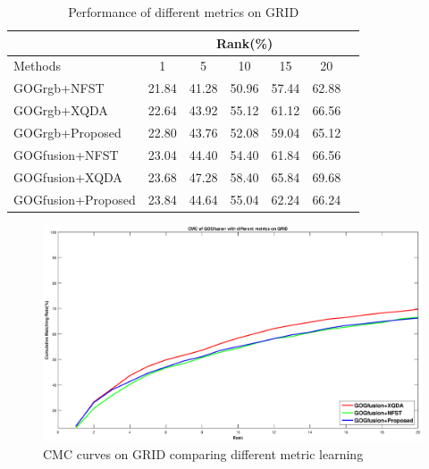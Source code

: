 \documentclass[conference,compsoc]{IEEEtran}
\begin{document}
\begin{table}[H]
\caption{Performance of different metrics on GRID}
\centering
\begin{tabular}{|l|c|c|c|c|c|c|}
\hline
& \multicolumn{5}{|c|}{Rank(\%)} \\
\hline
Methods& 1 & 5 &10& 15&20\\
\hline
GOGrgb+NFST& 21.84&41.28 &50.96& 57.44&62.88 \\ 
\hline
GOGrgb+XQDA& 22.64&43.92 &55.12 &61.12&66.56\\ 
\hline
GOGrgb+Proposed&22.80&43.76&52.08&59.04&65.12\\  %
\hline
GOGfusion+NFST& 23.04&44.40 &54.40 &61.84&66.56\\ 
\hline
GOGfusion+XQDA& 23.68&47.28 &58.40 &65.84&69.68 \\ 
\hline
GOGfusion+Proposed&23.84&44.64&55.04&62.24&66.24\\ %

\hline

\end{tabular}
\end{table}

\begin{figure}
\begin{raggedleft}
\includegraphics[width=1\linewidth]{GRID.eps}
\vspace{-3em}
\caption{CMC curves on GRID comparing different metric learning}
\end{raggedleft}
\end{figure}
\end{document}
